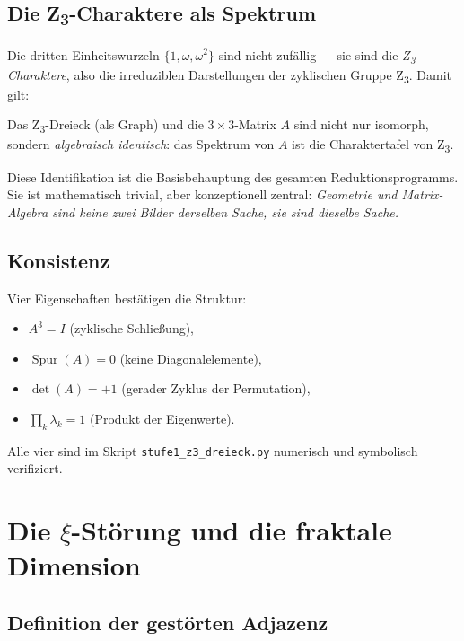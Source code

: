 \subsection{Die Z\textsubscript{3}-Charaktere als Spektrum}

Die dritten Einheitswurzeln \(\{1, \omega, \omega^2\}\) sind nicht zufällig — sie sind die \emph{Z\textsubscript{3}-Charaktere}, also die irreduziblen Darstellungen der zyklischen Gruppe Z\textsubscript{3}. Damit gilt:

\begin{insightBox}
Das Z\textsubscript{3}-Dreieck (als Graph) und die 3\,\(\times\)\,3-Matrix \(A\) sind nicht nur isomorph, sondern \emph{algebraisch identisch}: das Spektrum von \(A\) ist die Charaktertafel von Z\textsubscript{3}.
\end{insightBox}

Diese Identifikation ist die Basisbehauptung des gesamten Reduktionsprogramms. Sie ist mathematisch trivial, aber konzeptionell zentral: \emph{Geometrie und Matrix-Algebra sind keine zwei Bilder derselben Sache, sie sind dieselbe Sache.}

\subsection{Konsistenz}

Vier Eigenschaften bestätigen die Struktur:
\begin{itemize}
\item \(A^3 = I\) (zyklische Schließung),
\item \(\operatorname{Spur}(A) = 0\) (keine Diagonalelemente),
\item \(\det(A) = +1\) (gerader Zyklus der Permutation),
\item \(\prod_k \lambda_k = 1\) (Produkt der Eigenwerte).
\end{itemize}

Alle vier sind im Skript \texttt{stufe1\_z3\_dreieck.py} numerisch und symbolisch verifiziert.

\section[Die xi-Störung und die fraktale Dimension]{Die \(\xi\)-Störung und die fraktale Dimension}
\label{sec:kern2}

\subsection{Definition der gestörten Adjazenz}

